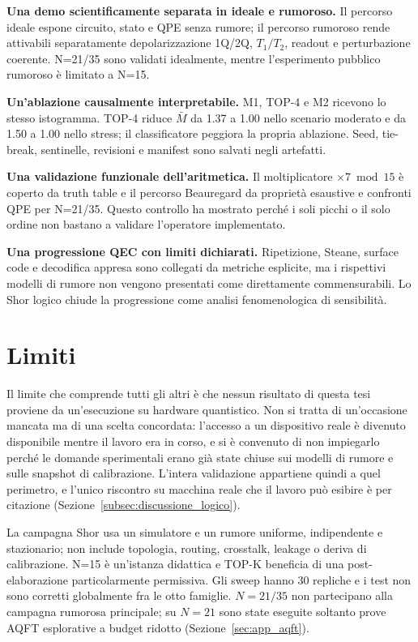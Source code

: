 \begin{onehalfspace}
\textbf{Una demo scientificamente separata in ideale e rumoroso.}
Il percorso ideale espone circuito, stato e QPE senza rumore; il percorso
rumoroso rende attivabili separatamente depolarizzazione 1Q/2Q,
$T_1/T_2$, readout e perturbazione coerente. N=21/35 sono validati
idealmente, mentre l'esperimento pubblico rumoroso è limitato a N=15.

\textbf{Un'ablazione causalmente interpretabile.}
M1, TOP-4 e M2 ricevono lo stesso istogramma. TOP-4 riduce $\bar M$ da
1.37 a 1.00 nello scenario moderato e da 1.50 a 1.00 nello stress; il
classificatore peggiora la propria ablazione. Seed, tie-break,
sentinelle, revisioni e manifest sono salvati negli artefatti.

\textbf{Una validazione funzionale dell'aritmetica.}
Il moltiplicatore $\times7\bmod15$ è coperto da truth table e il percorso
Beauregard da proprietà esaustive e confronti QPE per N=21/35. Questo
controllo ha mostrato perché i soli picchi o il solo ordine non bastano a
validare l'operatore implementato.

\textbf{Una progressione QEC con limiti dichiarati.}
Ripetizione, Steane, surface code e decodifica appresa sono collegati da
metriche esplicite, ma i rispettivi modelli di rumore non vengono
presentati come direttamente commensurabili. Lo Shor logico chiude la
progressione come analisi fenomenologica di sensibilità.

\section{Limiti}
\label{sec:limiti_finali}

Il limite che comprende tutti gli altri è che nessun risultato di questa
tesi proviene da un'esecuzione su hardware quantistico. Non si tratta di
un'occasione mancata ma di una scelta concordata: l'accesso a un
dispositivo reale è divenuto disponibile mentre il lavoro era in corso, e
si è convenuto di non impiegarlo perché le domande sperimentali erano già
state chiuse sui modelli di rumore e sulle snapshot di calibrazione.
L'intera validazione appartiene quindi a quel perimetro, e l'unico
riscontro su macchina reale che il lavoro può esibire è per citazione
(Sezione~\ref{subsec:discussione_logico}).

La campagna Shor usa un simulatore e un rumore uniforme, indipendente e
stazionario; non include topologia, routing, crosstalk, leakage o deriva
di calibrazione. N=15 è un'istanza didattica e TOP-K beneficia di una
post-elaborazione particolarmente permissiva. Gli sweep hanno 30
repliche e i test non sono corretti globalmente fra le otto famiglie.
$N=21/35$ non partecipano alla campagna rumorosa principale; su $N=21$
sono state eseguite soltanto prove AQFT esplorative a budget ridotto
(Sezione~\ref{sec:app_aqft}).


\end{onehalfspace}
